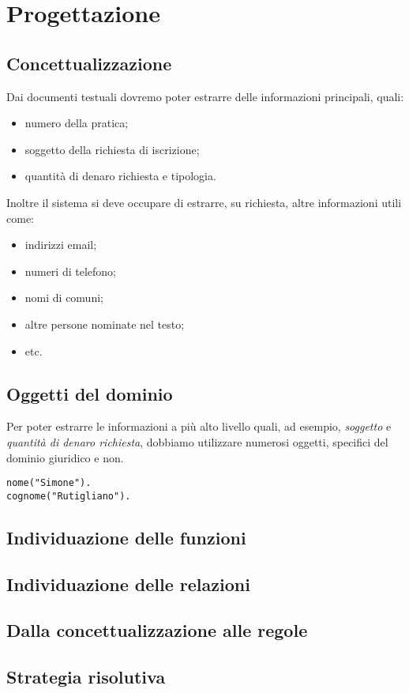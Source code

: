 \section{Progettazione}

\subsection{Concettualizzazione}
Dai documenti testuali dovremo poter estrarre delle informazioni principali, quali:
\begin{itemize}
\item numero della pratica; %
\item soggetto della richiesta di iscrizione;
\item quantità di denaro richiesta e tipologia.
\end{itemize}

Inoltre il sistema si deve occupare di estrarre, su richiesta, altre informazioni utili come:
\begin{itemize}
\item indirizzi email;
\item numeri di telefono;
\item nomi di comuni;
\item altre persone nominate nel testo;
\item etc.
\end{itemize}



\subsection{Oggetti del dominio}
Per poter estrarre le informazioni a più alto livello quali, ad esempio, \emph{soggetto} e \emph{quantità di denaro richiesta}, dobbiamo utilizzare numerosi oggetti, specifici del dominio giuridico e non.

\begin{lstlisting}
nome("Simone").
cognome("Rutigliano").
\end{lstlisting}


\subsection{Individuazione delle funzioni}

\subsection{Individuazione delle relazioni}

\subsection{Dalla concettualizzazione alle regole}

\subsection{Strategia risolutiva}
